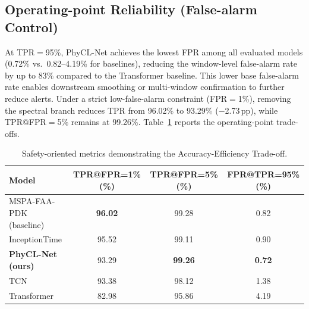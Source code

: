 \documentclass[jec]{acnsart}
\begin{document}
\begin{table}[htbp]
\caption{Comparison of model complexity and efficiency.}
\label{tab:complexity}
\centering
{}
\end{table}

\subsection{Operating-point Reliability (False-alarm Control)}

At TPR${=}$95\%, PhyCL-Net achieves the lowest FPR among all evaluated models (0.72\% vs.\ 0.82--4.19\% for baselines), reducing the window-level false-alarm rate by up to 83\% compared to the Transformer baseline. This lower base false-alarm rate enables downstream smoothing or multi-window confirmation to further reduce alerts. Under a strict low-false-alarm constraint (FPR${=}$1\%), removing the spectral branch reduces TPR from 96.02\% to 93.29\% ($-$2.73\,pp), while TPR@FPR${=}$5\% remains at 99.26\%. Table~\ref{tab:safety} reports the operating-point trade-offs.

\begin{table}[htbp]
\caption{Safety-oriented metrics demonstrating the Accuracy-Efficiency Trade-off.}
\label{tab:safety}
\centering
\small
\begin{tabular}{lccc}
\toprule
Model & TPR@FPR=1\% (\%) & TPR@FPR=5\% (\%) & FPR@TPR=95\% (\%) \\
\midrule
MSPA-FAA-PDK (baseline) & \textbf{96.02} & 99.28 & 0.82 \\
InceptionTime & 95.52 & 99.11 & 0.90 \\
\textbf{PhyCL-Net (ours)} & 93.29 & \textbf{99.26} & \textbf{0.72} \\
TCN & 93.38 & 98.12 & 1.38 \\
Transformer & 82.98 & 95.86 & 4.19 \\
\bottomrule
\end{tabular}
\end{table}
\end{document}
